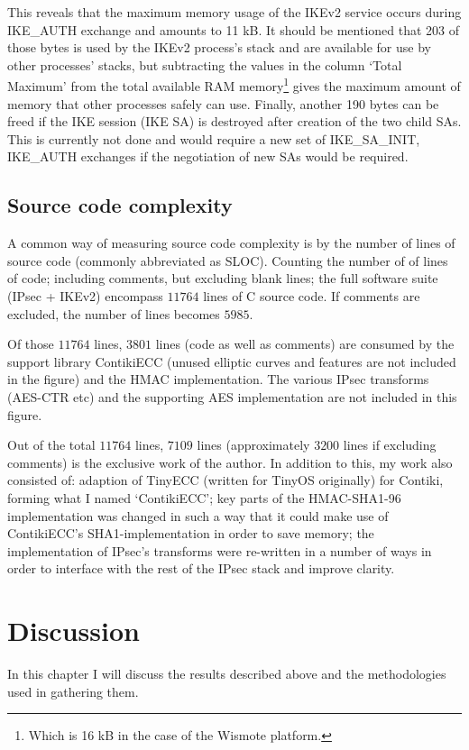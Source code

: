 \documentclass[final,a4paper,twoside,11pt,onecolumn]{report}
\begin{document}
This reveals that the maximum memory usage of the IKEv2 service occurs during IKE\_AUTH exchange and amounts to 11 kB. It should be mentioned that 203 of those bytes is used by the IKEv2 process's stack and are available for use by other processes' stacks, but subtracting the values in the column `Total Maximum' from the total available RAM memory\footnote{Which is 16 kB in the case of the Wismote platform.} gives the maximum amount of memory that other processes safely can use. Finally, another 190 bytes can be freed if the IKE session (IKE SA) is destroyed after creation of the two child SAs. This is currently not done and would require a new set of IKE\_SA\_INIT, IKE\_AUTH exchanges if the negotiation of new SAs would be required.  


\section{Source code complexity}
A common way of measuring source code complexity is by the number of lines of source code (commonly abbreviated as SLOC). Counting the number of of lines of code; including comments, but excluding blank lines; the full software suite (IPsec + IKEv2) encompass $11 764$ lines of C source code. If comments are excluded, the number of lines becomes $5 985$.

Of those $11 764$ lines, $3 801$ lines (code as well as comments) are consumed by the support library ContikiECC (unused elliptic curves and features are not included in the figure) and the HMAC implementation. The various IPsec transforms (AES-CTR etc) and the supporting AES implementation are not included in this figure.

Out of the total $11 764$ lines, $7 109$ lines (approximately $3 200$ lines if excluding comments) is the exclusive work of the author. In addition to this, my work also consisted of: adaption of TinyECC (written for TinyOS originally) for Contiki, forming what I named `ContikiECC'; key parts of the HMAC-SHA1-96 implementation was changed in such a way that it could make use of ContikiECC's SHA1-implementation in order to save memory; the implementation of IPsec's transforms were re-written in a number of ways in order to interface with the rest of the IPsec stack and improve clarity.




\chapter{Discussion}
In this chapter I will discuss the results described above and the methodologies used in gathering them.
\end{document}
